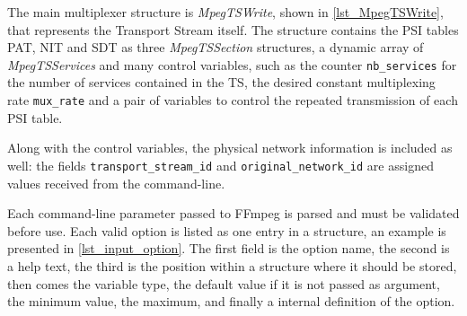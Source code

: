 \documentclass[
	12pt,				%
	openright,			%
	twoside,			%
	a4paper,			%
	brazil,
	french,				%
	english
	]{abntex2}
\begin{document}
The main multiplexer structure is \textit{MpegTSWrite}, shown in \autoref{lst_MpegTSWrite}, that represents the Transport Stream itself. The structure contains the PSI tables PAT, NIT and SDT as three \textit{MpegTSSection} structures, a dynamic array of \textit{MpegTSServices} and many control variables, such as the counter \texttt{nb\hspace{0.1mm}\_\hspace{0.1mm}services} for the number of services contained in the TS, the desired constant multiplexing rate \texttt{mux\hspace{0.1mm}\_\hspace{0.1mm}rate} and a pair of variables to control the repeated transmission of each PSI table.

Along with the control variables, the physical network information is included as well: the fields \texttt{transport\hspace{0.1mm}\_\hspace{0.1mm}stream\hspace{0.1mm}\_\hspace{0.1mm}id} and \texttt{original\hspace{0.1mm}\_\hspace{0.1mm}network\hspace{0.1mm}\_\hspace{0.1mm}id} are assigned values received from the command-line.

Each command-line parameter passed to FFmpeg is parsed and must be validated before use. Each valid option is listed as one entry in a structure, an example is presented in \autoref{lst_input_option}. The first field is the option name, the second is a help text, the third is the position within a structure where it should be stored, then comes the variable type, the default value if it is not passed as argument, the minimum value, the maximum, and finally a internal definition of the option.

\end{document}
